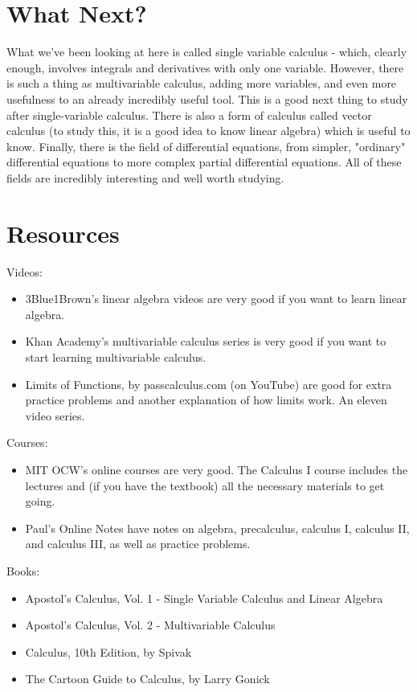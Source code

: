 \documentclass[12pt]{article}
\begin{document}
\section{What Next?}

What we've been looking at here is called single variable calculus - which, clearly enough, involves integrals and derivatives with only one variable. 
However, there is such a thing as multivariable calculus, adding more variables, and even more usefulness to an already incredibly useful tool. 
This is a good next thing to study after single-variable calculus. 
There is also a form of calculus called vector calculus (to study this, it is a good idea to know
linear algebra) which is useful to know. 
Finally, there is the field of differential equations, from simpler, "ordinary" differential equations to more complex partial differential equations. 
All of these fields are incredibly interesting and well worth studying.

\section{Resources}

Videos:
\begin{itemize}
\item 3Blue1Brown's linear algebra videos are very good if you want to learn linear algebra.
\item Khan Academy's multivariable calculus series is very good if you want to start learning multivariable calculus.
\item Limits of Functions, by passcalculus.com (on YouTube) are good for extra practice problems and another explanation of how limits work. An eleven video series.
\end{itemize}

Courses:
\begin{itemize}
\item MIT OCW's online courses are very good. The Calculus I course includes the lectures and (if you have the textbook) all the necessary materials to get going.
\item Paul's Online Notes have notes on algebra, precalculus, calculus I, calculus II, and calculus III, as well as practice problems.
\end{itemize}

Books:
\begin{itemize}
\item Apostol's Calculus, Vol. 1 - Single Variable Calculus and Linear Algebra
\item Apostol's Calculus, Vol. 2 - Multivariable Calculus
\item Calculus, 10th Edition, by Spivak
\item The Cartoon Guide to Calculus, by Larry Gonick
\end{itemize}
\end{document}
